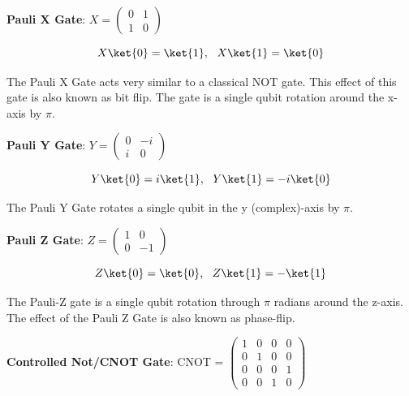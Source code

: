 \documentclass{article}
\begin{document}
\textbf{Pauli X Gate}: \qquad $X = \begin{pmatrix} 0 & 1 \\ 1 & 0 \end{pmatrix}$
\vspace{5mm}


\begin{equation}
X\ket{0} = \ket{1} , \ \ X\ket{1} = \ket{0}
\end{equation}
\vspace{5mm}

\noindent
The Pauli X Gate acts very similar to a classical NOT gate. This effect of this gate is also known as bit flip. The gate is a single qubit rotation around the x-axis by $\pi$.
\vspace{5mm}


\textbf{Pauli Y Gate}: \qquad $Y = \begin{pmatrix} 0 & -i \\ i & 0 \end{pmatrix}$
\vspace{5mm}


\begin{equation}
Y\ket{0} = i\ket{1} , \ \ Y\ket{1} = -i\ket{0}
\end{equation}
\vspace{5mm}

\noindent
The Pauli Y Gate rotates a single qubit in the y (complex)-axis by $\pi$.
\vspace{5mm}


\textbf{Pauli Z Gate}: \qquad $Z = \begin{pmatrix} 1 & 0 \\ 0 & -1 \end{pmatrix}$
\vspace{5mm}


\begin{equation}
Z\ket{0} = \ket{0} , \ \ Z\ket{1} = -\ket{1}  
\end{equation}
\vspace{5mm}

\noindent
The Pauli-Z gate is a single qubit rotation through $\pi$ radians around the z-axis. The effect of the Pauli Z Gate is also known as phase-flip.
\vspace{5mm}

\textbf{Controlled Not/CNOT Gate}: \qquad CNOT = $\begin{pmatrix} 1 & 0 & 0 & 0 \\ 0 & 1 & 0 & 0 \\ 0 & 0 & 0 & 1 \\ 0 & 0 & 1 & 0 \end{pmatrix}$
\vspace{5mm}
\end{document}
